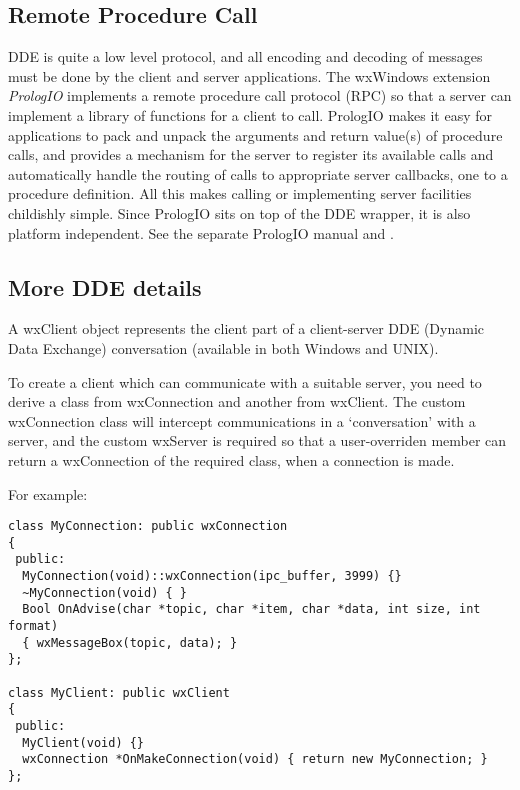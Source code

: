 \subsection{Remote Procedure Call}

DDE is quite a low level protocol, and all encoding and decoding of
messages must be done by the client and server applications. The
wxWindows extension {\it PrologIO}\/ implements a remote procedure call
protocol (RPC) so that a server can implement a library of functions for
a client to call.  PrologIO makes it easy for applications to pack and
unpack the arguments and return value(s) of procedure calls, and
provides a mechanism for the server to register its available calls and
automatically handle the routing of calls to appropriate server
callbacks, one to a procedure definition. All this makes calling or
implementing server facilities childishly simple. Since PrologIO sits on
top of the DDE wrapper, it is also platform independent. See the
separate PrologIO manual and .

\subsection{More DDE details}

A wxClient object represents the client part of a client-server DDE
(Dynamic Data Exchange) conversation (available in both
Windows and UNIX).

To create a client which can communicate with a suitable server,
you need to derive a class from wxConnection and another from wxClient.
The custom wxConnection class will intercept communications in
a `conversation' with a server, and the custom wxServer is required
so that a user-overriden  member can return
a wxConnection of the required class, when a connection is made.

For example:

\begin{verbatim}
class MyConnection: public wxConnection
{
 public:
  MyConnection(void)::wxConnection(ipc_buffer, 3999) {}
  ~MyConnection(void) { }
  Bool OnAdvise(char *topic, char *item, char *data, int size, int format)
  { wxMessageBox(topic, data); }
};

class MyClient: public wxClient
{
 public:
  MyClient(void) {}
  wxConnection *OnMakeConnection(void) { return new MyConnection; }
};

\end{verbatim}

